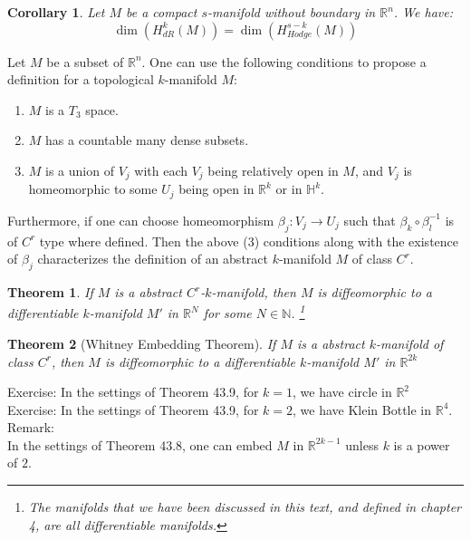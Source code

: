 \documentclass[15pt]{book}
\theoremstyle{break}
\theoremstyle{break}
\newtheorem{thm}{Theorem}[section]
\newtheorem{corT}[lem]{Corollary}
\newcommand{\R}{\mathbb{R}}
\newcommand{\N}{\mathbb{N}}
\newcommand{\that}[1]{\widetilde{#1}}
\newcommand{\bmat}[1]{\begin{bmatrix} #1 \end{bmatrix}}
\newcommand{\remark}{\color{blue}Remark: \color{black}}
\newcommand{\exercise}{\color{green}Exercise: \color{black}}
\begin{document}
\begin{corT}
Let $M$ be a compact $s$-manifold without boundary in $\R^n$. We have:
$$\dim(H_{dR}^k(M)) = \dim(H_{Hodge}^{s-k}(M))$$
\end{corT}

Let $M$ be a subset of $\R^n$. One can use the following conditions to propose a definition for a topological $k$-manifold $M$:
\begin{enumerate}[topsep=3pt,itemsep=-1ex,partopsep=1ex,parsep=1ex]
\item $M$ is a $T_3$ space. 
\item $M$ has a countable many dense subsets.
\item $M$ is a union of $V_j$ with each $V_j$ being relatively open in $M$, and $V_j$ is homeomorphic to some $U_j$ being open in $\R^k$ or in $\mathbb{H}^k$.  
\end{enumerate} 
Furthermore, if one can choose homeomorphism $\beta_j: V_j \to U_j$ such that $\beta_k \circ \beta_l^{-1}$ is of $C^r$ type where defined. Then the above (3) conditions along with the existence of $\beta_j$ characterizes the definition of an abstract $k$-manifold $M$ of class $C^r$.

\begin{thm}
If $M$ is a abstract $C^r$-$k$-manifold, then $M$ is diffeomorphic to a differentiable $k$-manifold $M'$ in $\R^N$ for some $N \in \N$. \footnote{The manifolds that we have been discussed in this text, and defined in chapter 4, are all differentiable manifolds.}
\end{thm}

\begin{thm}[Whitney Embedding Theorem]
If $M$ is a abstract $k$-manifold of class $C^r$, then $M$ is diffeomorphic to a differentiable $k$-manifold $M'$ in $\R^{2k}$
\end{thm}

\exercise In the settings of Theorem 43.9, for $k=1$, we have circle in $\R^2$\\
\exercise In the settings of Theorem 43.9, for $k=2$, we have Klein Bottle in $\R^4$. \\

\remark\\ 
In the settings of Theorem 43.8, one can embed $M$ in $\R^{2k-1}$ unless $k$ is a power of $2$.\\


\end{document}
